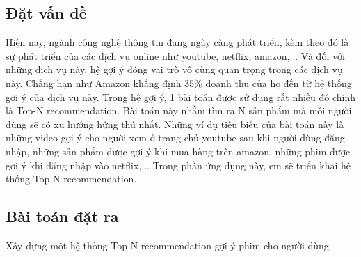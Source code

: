 \subsection{Đặt vấn đề}
Hiện nay, ngành công nghệ thông tin đang ngày càng phát triển, kèm theo đó là sự phát triển của các dịch vụ online như youtube, netflix, amazon,... Và đối với những dịch vụ này, hệ gợi ý đóng vai trò vô cùng quan trọng trong các dịch vụ này. Chẳng hạn như Amazon khẳng định 35\% doanh thu của họ đến từ hệ thống gợi ý của dịch vụ này. Trong hệ gợi ý, 1 bài toán được sử dụng rất nhiều đó chính là Top-N recommendation.
\newline Bài toán này nhằm tìm ra N sản phẩm mà mỗi người dùng sẽ có xu hướng hứng thú nhất. Những ví dụ tiêu biểu của bài toán này là những video gợi ý cho người xem ở trang chủ youtube sau khi người dùng đăng nhập, những sản phẩm được gợi ý khi mua hàng trên amazon, những phim được gợi ý khi đăng nhập vào netflix,...
\newline Trong phần ứng dụng này, em sẽ triển khai hệ thống Top-N recommendation.

\subsection{Bài toán đặt ra}
Xây dựng một hệ thống Top-N recommendation gợi ý phim cho người dùng.